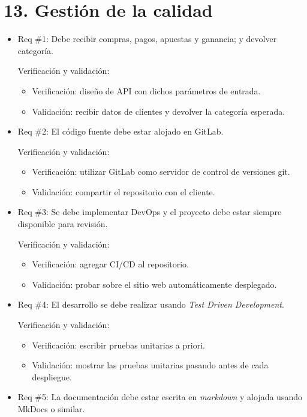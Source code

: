 \documentclass[11pt]{charter}
\begin{document}
\section{13. Gestión de la calidad}
\label{sec:calidad}

\begin{itemize} 
\item Req \#1: Debe recibir compras, pagos, apuestas y ganancia; y devolver categoría.

Verificación y validación:
\begin{itemize}
  \item Verificación: diseño de API con dichos parámetros de entrada. 
  \item Validación: recibir datos de clientes y devolver la categoría esperada.
\end{itemize}

\item Req \#2: El código fuente debe estar alojado en GitLab.

Verificación y validación:
\begin{itemize}
  \item Verificación: utilizar GitLab como servidor de control de versiones git.
  \item Validación: compartir el repositorio con el cliente.
\end{itemize}

\item Req \#3: Se debe implementar DevOps y el proyecto debe estar siempre disponible para revisión.

Verificación y validación:
\begin{itemize}
  \item Verificación: agregar CI/CD al repositorio.
  \item Validación: probar sobre el sitio web automáticamente desplegado.
\end{itemize}

\item Req \#4: El desarrollo se debe realizar usando \textit{Test Driven Development}.

Verificación y validación:
\begin{itemize}
  \item Verificación: escribir pruebas unitarias a priori.
  \item Validación: mostrar las pruebas unitarias pasando antes de cada despliegue. 
\end{itemize}

\item Req \#5: La documentación debe estar escrita en \textit{markdown} y alojada usando MkDocs o similar.


\end{itemize}
\end{document}
